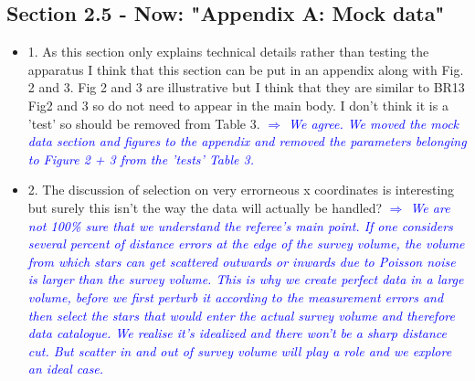 \documentclass[10pt,a4paper]{article}
\newcommand{\Comment}[1]{\textsl{\textcolor{Blue}{$\Longrightarrow$ {#1}}}}
\begin{document}
\subsection{Section 2.5 - Now: "Appendix A: Mock data"}
\begin{itemize}
\item 1. As this section only explains technical details rather than testing the apparatus I think that this section can be put in an appendix along with Fig. 2 and 3. Fig 2 and 3 are illustrative but I think that they are similar to BR13 Fig2 and 3 so do not need to appear in the main body. I don't think it is a 'test' so should be removed from Table 3. \Comment{We agree. We moved the mock data section and figures to the appendix and removed the parameters belonging to Figure 2 + 3 from the 'tests' Table 3.}
\item 2. The discussion of selection on very errorneous x coordinates is interesting but surely this isn't the way the data will actually be handled?
\Comment{We are not 100\% sure that we understand the referee's main point. If one considers several percent of distance errors at the edge of the survey volume, the volume from which stars can get scattered outwards or inwards due to Poisson noise is larger than the survey volume. This is why we create perfect data in a large volume, before we first perturb it according to the measurement errors and then select the stars that would enter the actual survey volume and therefore data catalogue. We realise it's idealized and there won't be a sharp distance cut. But scatter in and out of survey volume will play a role and we explore an ideal case.}
\end{itemize}
\end{document}
